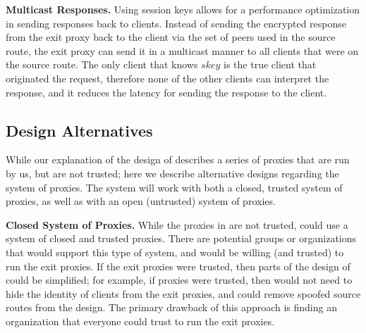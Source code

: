 \textbf{Multicast Responses.}
Using session keys allows for a performance optimization in sending responses back to clients.  Instead of sending 
the encrypted response from the exit proxy back to the client via the set of peers used in the source route, the exit 
proxy can send it in a multicast manner to all clients that were on the source route.  The only client that knows $skey$ 
is the true client that originated the request, therefore none of the other clients can interpret the response, and it reduces the 
latency for sending the response to the client.  


\subsection{Design Alternatives}
While our explanation of the design of \system{} describes a series of proxies that are run by us, but are not 
trusted; here we describe alternative designs regarding the system of proxies.  The system will work with both a closed, 
trusted system of proxies, as well as with an open (untrusted) system of proxies.

{\bf Closed System of Proxies.} While the proxies in \system{} are not trusted, \system{} could 
use a system of closed and trusted proxies.  There are potential groups or organizations that would 
support this type of system, and would be willing (and trusted) to run the exit proxies.  If the exit
proxies were trusted, then parts of the design of \system{} could be simplified; for example, if proxies 
were trusted, then \system{} would not need to hide the identity of clients from the exit proxies, and could 
remove spoofed source routes from the design.  The primary drawback of this approach is finding an organization 
that everyone could trust to run the exit proxies.  

